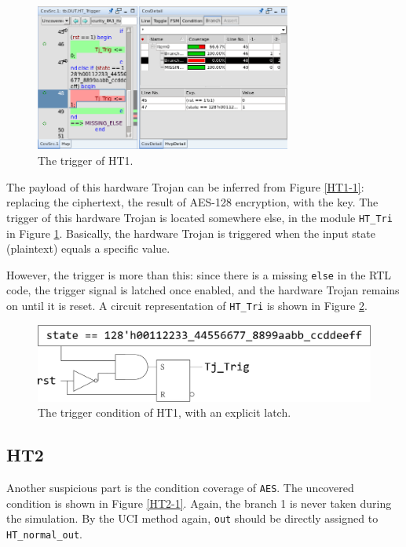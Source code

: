 \documentclass{article}
\begin{document}
\begin{figure}[h] \centering
\includegraphics[width=0.75\textwidth]{HT1-2}
\caption{The trigger of HT1.}
\label{HT1-2}
\end{figure}

The payload of this hardware Trojan can be inferred from Figure \ref{HT1-1}: replacing the ciphertext, the result of AES-128 encryption, with the key. The trigger of this hardware Trojan is located somewhere else, in the module \verb|HT_Tri| in Figure \ref{HT1-2}. Basically, the hardware Trojan is triggered when the input state (plaintext) equals a specific value.

However, the trigger is more than this: since there is a missing \verb|else| in the RTL code, the trigger signal is latched once enabled, and the hardware Trojan remains on until it is reset. A circuit representation of \verb|HT_Tri| is shown in Figure \ref{HT_Tri}.

\begin{figure}[h] \centering
\includegraphics[width=\textwidth]{HT_Tri}
\caption{The trigger condition of HT1, with an explicit latch.}
\label{HT_Tri}
\end{figure}

\subsection{HT2}

Another suspicious part is the condition coverage of \verb|AES|. The uncovered condition is shown in Figure \ref{HT2-1}. Again, the branch 1 is never taken during the simulation. By the UCI method again, \verb|out| should be directly assigned to \verb|HT_normal_out|.
\end{document}
